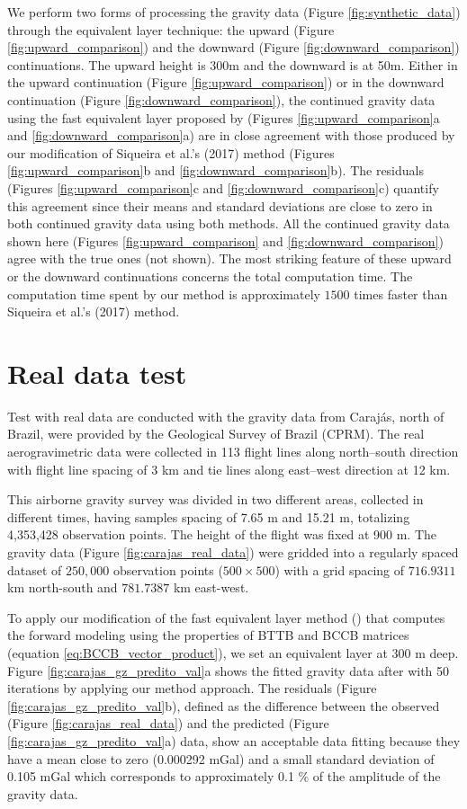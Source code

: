 \documentclass[paper]{geophysics}
\begin{document}
We perform two forms of processing the gravity data (Figure \ref{fig:synthetic_data}) through the equivalent layer technique: the upward (Figure \ref{fig:upward_comparison}) and the downward (Figure \ref{fig:downward_comparison}) continuations. The upward height is 300m and the downward  is at 50m.   Either in the upward continuation (Figure \ref{fig:upward_comparison}) or in the downward continuation (Figure \ref{fig:downward_comparison}), the continued gravity data using the fast equivalent layer proposed by \cite{siqueira2017fast} (Figures \ref{fig:upward_comparison}a and \ref{fig:downward_comparison}a) are in close agreement with those produced by our modification of Siqueira et al.'s (2017) method (Figures \ref{fig:upward_comparison}b and \ref{fig:downward_comparison}b). The residuals (Figures \ref{fig:upward_comparison}c and \ref{fig:downward_comparison}c) quantify this agreement since their means and standard deviations are close to zero in both continued gravity data using both methods.  All the continued gravity data shown here (Figures \ref{fig:upward_comparison} and \ref{fig:downward_comparison}) agree with the true ones (not shown). The most striking feature of these upward or the downward continuations concerns the total computation time. The computation time spent by our method is approximately $1500$ times faster than Siqueira et al.'s (2017) method. 


\section{Real data test}
Test with real data are conducted with the gravity data from Caraj\'as, north of Brazil, were provided by the  Geological Survey of Brazil (CPRM). The real aerogravimetric data were collected in 113 flight lines along north–south direction with flight line spacing  of 3 km and tie lines along east–west direction at 12 km.

This airborne gravity survey was divided in two different areas, collected in different times, having samples spacing of 7.65 m and 15.21 m, totalizing  4,353,428 observation points. The height of the flight was fixed at 900 m. The gravity data (Figure \ref{fig:carajas_real_data}) were gridded into a regularly spaced dataset of $250,000$ observation points ($500 \times 500$) with a grid spacing of $716.9311$ km north-south and $781.7387$ km east-west.

To apply our modification of the fast equivalent layer method (\cite{siqueira2017fast})  that computes the forward modeling using the properties of BTTB and BCCB matrices (equation \ref{eq:BCCB_vector_product}), we set an equivalent layer at 300 m deep. Figure \ref{fig:carajas_gz_predito_val}a shows the fitted gravity data after with 50 iterations by applying our method approach. The residuals (Figure \ref{fig:carajas_gz_predito_val}b), defined as the difference between the observed (Figure \ref{fig:carajas_real_data}) and the predicted (Figure \ref{fig:carajas_gz_predito_val}a) data,  show an acceptable data fitting because they have a mean close to zero (0.000292 mGal) and a small standard deviation of 0.105 mGal which corresponds to approximately 0.1 \% of the amplitude of the gravity data.
\end{document}
